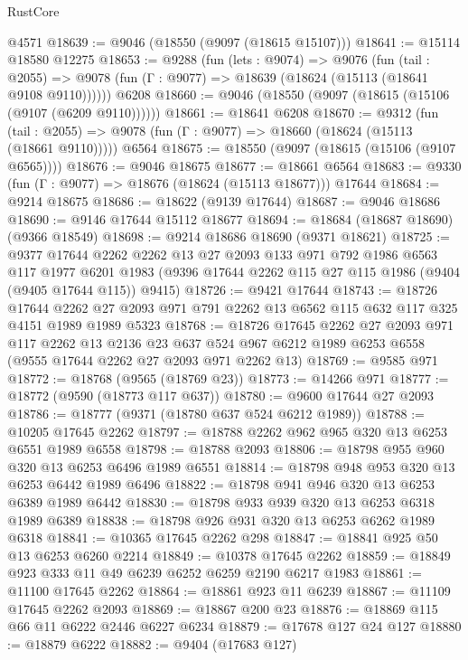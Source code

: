 \begin{lexlean}{RustCore}
\begin{coremodule}
    @4571
@18639 := @9046 (@18550 (@9097 (@18615 @15107)))
@18641 := @15114 @18580 @12275
@18653 := @9288
    (fun (lets : @9074) =>
    @9076
      (fun (tail : @2055) =>
      @9078 (fun (Γ : @9077) => @18639 (@18624 (@15113 (@18641 @9108 @9110))))))
    @6208
@18660 := @9046 (@18550 (@9097 (@18615 (@15106 (@9107 (@6209 @9110))))))
@18661 := @18641 @6208
@18670 := @9312
    (fun (tail : @2055) => @9078 (fun (Γ : @9077) => @18660 (@18624 (@15113 (@18661 @9110)))))
    @6564
@18675 := @18550 (@9097 (@18615 (@15106 (@9107 @6565))))
@18676 := @9046 @18675
@18677 := @18661 @6564
@18683 := @9330 (fun (Γ : @9077) => @18676 (@18624 (@15113 @18677))) @17644
@18684 := @9214 @18675
@18686 := @18622 (@9139 @17644)
@18687 := @9046 @18686
@18690 := @9146 @17644 @15112 @18677
@18694 := @18684 (@18687 @18690) (@9366 @18549)
@18698 := @9214 @18686 @18690 (@9371 @18621)
@18725 := @9377
    @17644
    @2262
    @2262
    @13
    @27
    @2093
    @133
    @971
    @792
    @1986
    @6563
    @117
    @1977
    @6201
    @1983
    (@9396 @17644 @2262 @115 @27 @115 @1986 (@9404 (@9405 @17644 @115)) @9415)
@18726 := @9421 @17644
@18743 := @18726
    @17644
    @2262
    @27
    @2093
    @971
    @791
    @2262
    @13
    @6562
    @115
    @632
    @117
    @325
    @4151
    @1989
    @1989
    @5323
@18768 := @18726
    @17645
    @2262
    @27
    @2093
    @971
    @117
    @2262
    @13
    @2136
    @23
    @637
    @524
    @967
    @6212
    @1989
    @6253
    @6558
    (@9555 @17644 @2262 @27 @2093 @971 @2262 @13)
@18769 := @9585 @971
@18772 := @18768 (@9565 (@18769 @23))
@18773 := @14266 @971
@18777 := @18772 (@9590 (@18773 @117 @637))
@18780 := @9600 @17644 @27 @2093
@18786 := @18777 (@9371 (@18780 @637 @524 @6212 @1989))
@18788 := @10205 @17645 @2262
@18797 := @18788 @2262 @962 @965 @320 @13 @6253 @6551 @1989 @6558
@18798 := @18788 @2093
@18806 := @18798 @955 @960 @320 @13 @6253 @6496 @1989 @6551
@18814 := @18798 @948 @953 @320 @13 @6253 @6442 @1989 @6496
@18822 := @18798 @941 @946 @320 @13 @6253 @6389 @1989 @6442
@18830 := @18798 @933 @939 @320 @13 @6253 @6318 @1989 @6389
@18838 := @18798 @926 @931 @320 @13 @6253 @6262 @1989 @6318
@18841 := @10365 @17645 @2262 @298
@18847 := @18841 @925 @50 @13 @6253 @6260 @2214
@18849 := @10378 @17645 @2262
@18859 := @18849 @923 @333 @11 @49 @6239 @6252 @6259 @2190 @6217 @1983
@18861 := @11100 @17645 @2262
@18864 := @18861 @923 @11 @6239
@18867 := @11109 @17645 @2262 @2093
@18869 := @18867 @200 @23
@18876 := @18869 @115 @66 @11 @6222 @2446 @6227 @6234
@18879 := @17678 @127 @24 @127
@18880 := @18879 @6222
@18882 := @9404 (@17683 @127)

\end{coremodule}
\end{lexlean}
